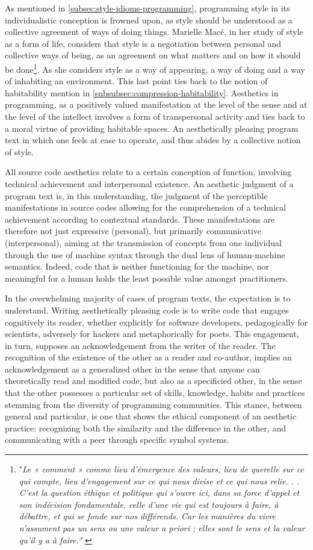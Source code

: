 As mentioned in \ref{subsec:style-idioms-programming}, programming style in its individualistic conception is frowned upon, as style should be understood as a collective agreement of ways of doing things. Marielle Macé, in her study of style as a form of life, considers that style is a negotiation between personal and collective ways of being, as an agreement on what matters and on how it should be done\footnote{"\emph{Le « comment » comme lieu d'émergence des valeurs, lieu de querelle sur ce qui compte, lieu d'engagement sur ce qui nous divise et ce qui nous relie. . . C'est la question éthique et politique qui s'ouvre ici, dans sa force d'appel et son indécision fondamentale, celle d'une vie qui est toujours à faire, à débattre, et qui se fonde sur nos différends. Car les manières du vivre n'assument pas un sens ou une valeur a priori ; elles sont le sens et la valeur qu'il y a à faire."} \citep{mace_styles_2016}}. As she considers style as a way of appearing, a way of doing and a way of inhabiting an environment. This last point ties back to the notion of habitability mention in \ref{subsubsec:compression-habitability}. Aesthetics in programming, as a positively valued manifestation at the level of the sense and at the level of the intellect involves a form of transpersonal activity and ties back to a moral virtue of providing habitable spaces. An aesthetically pleasing program text in which one feels at ease to operate, and thus abides by a collective notion of style.

All source code aesthetics relate to a certain conception of function, involving technical achievement and interpersonal existence. An aesthetic judgment of a program text is, in this understanding, the judgment of the perceptible manifestations in source codes allowing for the comprehension of a technical achievement according to contextual standards. These manifestations are therefore not just expressive (personal), but primarily communicative (interpersonal), aiming at the transmission of concepts from one individual through the use of machine syntax through the dual lens of human-machine semantics. Indeed, code that is neither functioning for the machine, nor meaningful for a human holds the least possible value amongst practitioners.

In the overwhelming majority of cases of program texts, the expectation is to understand. Writing aesthetically pleasing code is to write code that engages cognitively its reader, whether explicitly for software developers, pedagogically for scientists, adversely for hackers and metaphorically for poets. This engagement, in turn, supposes an acknowledgement from the writer of the reader. The recognition of the existence of the other as a reader and co-author, implies an acknowledgement as a generalized other in the sense that anyone can theoretically read and modified code, but also as a specificied other, in the sense that the other possesses a particular set of skills, knowledge, habits and practices stemming from the diversity of programming communities. This stance, between general and particular, is one that shows the ethical component of an aesthetic practice: recognizing both the similarity and the difference in the other, and communicating with a peer through specific symbol systems.

